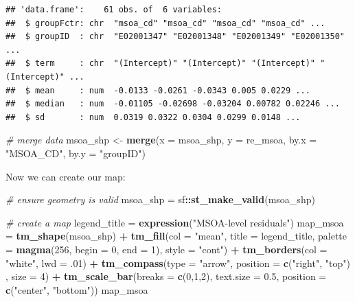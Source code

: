 \documentclass[
]{book}
\newenvironment{Shaded}{\begin{snugshade}}{\end{snugshade}}
\newcommand{\CommentTok}[1]{\textcolor[rgb]{0.56,0.35,0.01}{\textit{#1}}}
\newcommand{\DataTypeTok}[1]{\textcolor[rgb]{0.13,0.29,0.53}{#1}}
\newcommand{\DecValTok}[1]{\textcolor[rgb]{0.00,0.00,0.81}{#1}}
\newcommand{\FloatTok}[1]{\textcolor[rgb]{0.00,0.00,0.81}{#1}}
\newcommand{\KeywordTok}[1]{\textcolor[rgb]{0.13,0.29,0.53}{\textbf{#1}}}
\newcommand{\NormalTok}[1]{#1}
\newcommand{\OperatorTok}[1]{\textcolor[rgb]{0.81,0.36,0.00}{\textbf{#1}}}
\newcommand{\StringTok}[1]{\textcolor[rgb]{0.31,0.60,0.02}{#1}}
\begin{document}
\begin{verbatim}
## 'data.frame':    61 obs. of  6 variables:
##  $ groupFctr: chr  "msoa_cd" "msoa_cd" "msoa_cd" "msoa_cd" ...
##  $ groupID  : chr  "E02001347" "E02001348" "E02001349" "E02001350" ...
##  $ term     : chr  "(Intercept)" "(Intercept)" "(Intercept)" "(Intercept)" ...
##  $ mean     : num  -0.0133 -0.0261 -0.0343 0.005 0.0229 ...
##  $ median   : num  -0.01105 -0.02698 -0.03204 0.00782 0.02246 ...
##  $ sd       : num  0.0319 0.0322 0.0304 0.0299 0.0148 ...
\end{verbatim}

\begin{Shaded}
\begin{Highlighting}[]
\CommentTok{# merge data}
\NormalTok{msoa_shp <-}\StringTok{ }\KeywordTok{merge}\NormalTok{(}\DataTypeTok{x =}\NormalTok{ msoa_shp, }\DataTypeTok{y =}\NormalTok{ re_msoa, }\DataTypeTok{by.x =} \StringTok{"MSOA_CD"}\NormalTok{, }\DataTypeTok{by.y =} \StringTok{"groupID"}\NormalTok{)}
\end{Highlighting}
\end{Shaded}

Now we can create our map:

\begin{Shaded}
\begin{Highlighting}[]
\CommentTok{# ensure geometry is valid}
\NormalTok{msoa_shp =}\StringTok{ }\NormalTok{sf}\OperatorTok{::}\KeywordTok{st_make_valid}\NormalTok{(msoa_shp)}

\CommentTok{# create a map}
\NormalTok{legend_title =}\StringTok{ }\KeywordTok{expression}\NormalTok{(}\StringTok{"MSOA-level residuals"}\NormalTok{)}
\NormalTok{map_msoa =}\StringTok{ }\KeywordTok{tm_shape}\NormalTok{(msoa_shp) }\OperatorTok{+}
\StringTok{  }\KeywordTok{tm_fill}\NormalTok{(}\DataTypeTok{col =} \StringTok{"mean"}\NormalTok{, }\DataTypeTok{title =}\NormalTok{ legend_title, }\DataTypeTok{palette =} \KeywordTok{magma}\NormalTok{(}\DecValTok{256}\NormalTok{, }\DataTypeTok{begin =} \DecValTok{0}\NormalTok{, }\DataTypeTok{end =} \DecValTok{1}\NormalTok{), }\DataTypeTok{style =} \StringTok{"cont"}\NormalTok{) }\OperatorTok{+}\StringTok{ }
\StringTok{  }\KeywordTok{tm_borders}\NormalTok{(}\DataTypeTok{col =} \StringTok{"white"}\NormalTok{, }\DataTypeTok{lwd =} \FloatTok{.01}\NormalTok{)  }\OperatorTok{+}\StringTok{ }
\StringTok{  }\KeywordTok{tm_compass}\NormalTok{(}\DataTypeTok{type =} \StringTok{"arrow"}\NormalTok{, }\DataTypeTok{position =} \KeywordTok{c}\NormalTok{(}\StringTok{"right"}\NormalTok{, }\StringTok{"top"}\NormalTok{) , }\DataTypeTok{size =} \DecValTok{4}\NormalTok{) }\OperatorTok{+}\StringTok{ }
\StringTok{  }\KeywordTok{tm_scale_bar}\NormalTok{(}\DataTypeTok{breaks =} \KeywordTok{c}\NormalTok{(}\DecValTok{0}\NormalTok{,}\DecValTok{1}\NormalTok{,}\DecValTok{2}\NormalTok{), }\DataTypeTok{text.size =} \FloatTok{0.5}\NormalTok{, }\DataTypeTok{position =}  \KeywordTok{c}\NormalTok{(}\StringTok{"center"}\NormalTok{, }\StringTok{"bottom"}\NormalTok{)) }
\NormalTok{map_msoa}
\end{Highlighting}
\end{Shaded}
\end{document}

